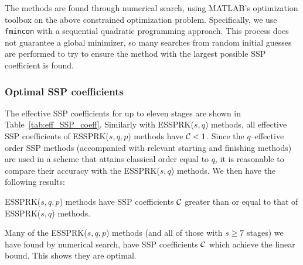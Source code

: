 The methods are found through numerical search, using \textsc{MATLAB}'s optimization 
toolbox on the above constrained optimization problem. 
Specifically, we use \texttt{fmincon} with a sequential quadratic programming approach.
This process does not guarantee a global minimizer, so many searches from random initial 
guesses are performed to try to ensure the method with the largest possible SSP coefficient is 
found.

\subsubsection{Optimal SSP coefficients}\label{subsubsec:optimal_SSP_coeff}
The effective SSP coefficients for up to eleven stages are shown in 
Table~\ref{tab:eff_SSP_coeff}. 
Similarly with ESSPRK($s,q$) methods, all effective SSP coefficients of ESSPRK($s,q,p$) methods 
have $\mathcal{C} < 1$. 
Since the $q$--effective order SSP methods (accompanied with relevant starting and finishing 
methods) are used in a scheme that attains classical order equal to $q$, it is reasonable to 
compare their accuracy with the ESSPRK($s,q$) methods.
We then have the following results:
\begin{result}
	ESSPRK($s,q,p$) methods have SSP coefficients $\mathcal{C}$ greater than or equal to that of 
	ESSPRK($s,q$) methods.
\end{result}
\begin{result}
	Many of the ESSPRK($s,q,p$) methods (and all of those with $s \ge 7$ stages) we have 
	found by numerical search, have SSP coefficients $\mathcal{C}$ which achieve the linear 
	bound. 
	This shows they are optimal.  
\end{result}

